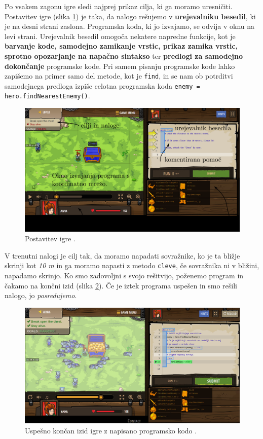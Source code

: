 Po vsakem zagonu igre sledi najprej prikaz cilja, ki ga moramo
uresničiti. Postavitev igre (slika \ref{fig:web:cc:ingame:game}) je
taka, da nalogo rešujemo v \textbf{urejevalniku besedil}, ki je na
desni strani zaslona. Programska koda, ki jo izvajamo, se odvija v oknu
na levi strani. Urejevalnik besedil omogoča nekatere napredne
funkcije, kot je \textbf{barvanje kode, samodejno zamikanje vrstic,
  prikaz zamika vrstic, sprotno opozarjanje na napačno sintakso} ter
\textbf{predlogi za samodejno dokončanje} programske kode. Pri samem
pisanju programske kode lahko zapišemo na primer samo del metode, kot
je \texttt{find}, in se nam ob potrditvi samodejnega predloga izpiše
celotna programska koda \texttt{enemy = hero.findNearestEnemy()}.

\begin{figure}[h!]
  \centering
    \includegraphics [width=0.55\linewidth, keepaspectratio =
   1] {./images/sc_web/cc_ingame-game-v01.jpg}
   \caption{Postavitev igre \cite{web:codecombat}.}
   \label{fig:web:cc:ingame:game}
 \end{figure}

 V trenutni nalogi je cilj tak, da moramo napadati sovražnike, ko je
 ta bližje skrinji kot \emph{10 m} in ga moramo napasti z metodo
 \texttt{cleve}, če  sovražnika ni v bližini, napadamo skrinjo. Ko
 smo zadovoljni s svojo rešitvijo, poženemo program in čakamo na končni
 izid (slika \ref{fig:web:cc:ingame:game2}). Če je iztek programa
 uspešen in smo rešili nalogo, jo \emph{posredujemo}.

\begin{figure}[h!]
  \centering
    \includegraphics [width=0.55\linewidth, keepaspectratio =
   1] {./images/sc_web/cc_ingame-game-v02.jpg}
   \caption{Uspešno končan izid igre z napisano programsko
     kodo \cite{web:codecombat}.}
   \label{fig:web:cc:ingame:game2}
 \end{figure}
 
